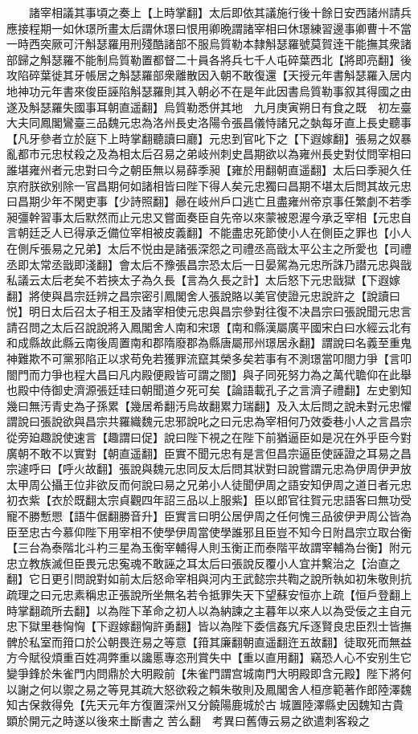 　　諸宰相議其事頃之奏上【上時掌翻】太后即依其議施行後十餘日安西諸州請兵應接程期一如休璟所畫太后謂休璟曰恨用卿晩謂諸宰相曰休璟練習邊事卿曹十不當一時西突厥可汗斛瑟羅用刑殘酷諸部不服烏質勒本隸斛瑟羅號莫賀逹干能撫其衆諸部歸之斛瑟羅不能制烏質勒置都督二十員各將兵七千人屯碎葉西北【將即亮翻】後攻陷碎葉徙其牙帳居之斛瑟羅部衆離散因入朝不敢復還【天授元年書斛瑟羅入居内地神功元年書來俊臣誣陷斛瑟羅則其入朝必不在是年此因書烏質勒事叙其得國之由遂及斛瑟羅失國事耳朝直遥翻】烏質勒悉併其地　九月庚寅朔日有食之既　初左臺大夫同鳳閣鸞臺三品魏元忠為洛州長史洛陽令張昌儀恃諸兄之埶每牙直上長史聽事【凡牙參者立於庭下上時掌翻聽讀曰廳】元忠到官叱下之【下遐嫁翻】張易之奴暴亂都市元忠杖殺之及為相太后召易之弟岐州刺史昌期欲以為雍州長史對仗問宰相曰誰堪雍州者元忠對曰今之朝臣無以易薛季昶【雍於用翻朝直遥翻】太后曰季昶久任京府朕欲别除一官昌期何如諸相皆曰陛下得人矣元忠獨曰昌期不堪太后問其故元忠曰昌期少年不閑吏事【少詩照翻】曏在岐州戶口逃亡且盡雍州帝京事任繁劇不若季昶彊幹習事太后默然而止元忠又嘗面奏臣自先帝以來蒙被恩渥今承乏宰相【元忠自言朝廷乏人已得承乏備位宰相被皮義翻】不能盡忠死節使小人在側臣之罪也【小人在側斥張易之兄弟】太后不悦由是諸張深怨之司禮丞高戩太平公主之所愛也【司禮丞即太常丞戩即淺翻】會太后不豫張昌宗恐太后一日晏駕為元忠所誅乃譛元忠與戩私議云太后老矣不若挾太子為久長【言為久長之計】太后怒下元忠戩獄【下遐嫁翻】將使與昌宗廷辨之昌宗密引鳳閣舍人張說賂以美官使證元忠說許之【說讀曰悦】明日太后召太子相王及諸宰相使元忠與昌宗參對往復不决昌宗曰張說聞元忠言請召問之太后召說說將入鳳閣舍人南和宋璟【南和縣漢屬廣平國宋白曰水經云北有和成縣故此縣云南後周置南和郡隋廢郡為縣唐屬邢州璟居永翻】謂說曰名義至重鬼神難欺不可黨邪陷正以求苟免若獲罪流竄其榮多矣若事有不測璟當叩閤力爭【言叩閤門而力爭也程大昌曰凡内殿便殿皆可謂之閤】與子同死努力為之萬代聸仰在此舉也殿中侍御史濟源張廷珪曰朝聞道夕死可矣【論語載孔子之言濟子禮翻】左史劉知幾曰無汚青史為子孫累【幾居希翻汚烏故翻累力瑞翻】及入太后問之說未對元忠懼謂說曰張說欲與昌宗共羅織魏元忠邪說叱之曰元忠為宰相何乃效委巷小人之言昌宗從旁廹趣說使速言【趣謂曰促】說曰陛下視之在陛下前猶逼臣如是况在外乎臣今對廣朝不敢不以實對【朝直遥翻】臣實不聞元忠有是言但昌宗逼臣使誣證之耳易之昌宗遽呼曰【呼火故翻】張說與魏元忠同反太后問其狀對曰說嘗謂元忠為伊周伊尹放太甲周公攝王位非欲反而何說曰易之兄弟小人徒聞伊周之語安知伊周之道日者元忠初衣紫【衣於既翻太宗貞觀四年詔三品以上服紫】臣以郎官往賀元忠語客曰無功受寵不勝慙愳【語牛倨翻勝音升】臣實言曰明公居伊周之任何愧三品彼伊尹周公皆為臣至忠古今慕仰陛下用宰相不使學伊周當使學誰邪且臣豈不知今日附昌宗立取台衡【三台為泰階北斗杓三星為玉衡宰輔得人則玉衡正而泰階平故謂宰輔為台衡】附元忠立教族滅但臣畏元忠寃魂不敢誣之耳太后曰張說反覆小人宜并繫治之【治直之翻】它日更引問說對如前太后怒命宰相與河内王武懿宗共鞫之說所執如初朱敬則抗疏理之曰元忠素稱忠正張說所坐無名若令抵罪失天下望蘇安恒亦上疏【恒戶登翻上時掌翻疏所去翻】以為陛下革命之初人以為納諫之主暮年以來人以為受佞之主自元忠下獄里巷恟恟【下遐嫁翻恟許勇翻】皆以為陛下委信姦宄斥逐賢良忠臣烈士皆撫髀於私室而箝口於公朝畏迕易之等意【箝其廉翻朝直遥翻迕五故翻】徒取死而無益方今賦役煩重百姓凋弊重以讒慝專恣刑賞失中【重以直用翻】竊恐人心不安别生它變爭鋒於朱雀門内問鼎於大明殿前【朱雀門謂宫城南門大明殿即含元殿】陛下將何以謝之何以禦之易之等見其疏大怒欲殺之賴朱敬則及鳳閣舍人桓彦範著作郎陸澤魏知古保救得免【先天元年方復置深州又分饒陽鹿城於古城置陸澤縣史因魏知古貴顕於開元之時遂以後來土斷書之苦么翻　考異曰舊傳云易之欲遣刺客殺之